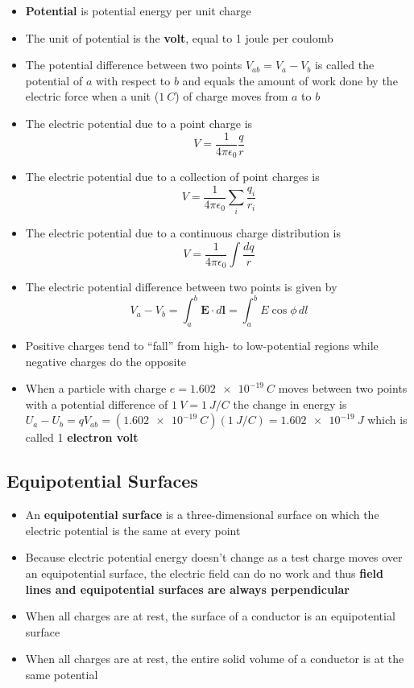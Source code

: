 \documentclass{article}
\newcommand{\ke}{\frac{1}{4 \pi \epsilon_0}}
\begin{document}
\begin{itemize}
  \item \textbf{Potential} is potential energy per unit charge

  \item The unit of potential is the \textbf{volt}, equal to 1 joule per coulomb

  \item The potential difference between two points $V_{ab} = V_a - V_b$ is called the potential of $a$ with respect to $b$ and equals the amount of work done by the electric force when a unit ($\qty{1}{C}$) of charge moves from $a$ to $b$

  \item The electric potential due to a point charge is \[V = \ke \frac{q}{r}\]

  \item The electric potential due to a collection of point charges is \[V = \ke \sum_i \frac{q_i}{r_i}\]

  \item The electric potential due to a continuous charge distribution is \[V = \ke \int \frac{dq}{r}\]

  \item The electric potential difference between two points is given by \[V_a - V_b = \int_a^b \mathbf{E} \cdot d\mathbf{l} = \int_a^b E \cos \phi \,dl\]

  \item Positive charges tend to ``fall'' from high- to low-potential regions while negative charges do the opposite

  \item When a particle with charge $e = \qty{1.602e-19}{C}$ moves between two points with a potential difference of $\qty{1}{V} = \qty{1}{J/C}$ the change in energy is $U_a - U_b = qV_{ab} = (\qty{1.602e-19}{C})(\qty{1}{J/C}) = \qty{1.602e-19}{J}$ which is called 1 \textbf{electron volt}
\end{itemize}

\setcounter{subsection}{3}
\subsection{Equipotential Surfaces}

\begin{itemize}
  \item An \textbf{equipotential surface} is a three-dimensional surface on which the electric potential is the same at every point

  \item Because electric potential energy doesn't change as a test charge moves over an equipotential surface, the electric field can do no work and thus \textbf{field lines and equipotential surfaces are always perpendicular}

  \item When all charges are at rest, the surface of a conductor is an equipotential surface

  \item When all charges are at rest, the entire solid volume of a conductor is at the same potential
\end{itemize}
\end{document}
